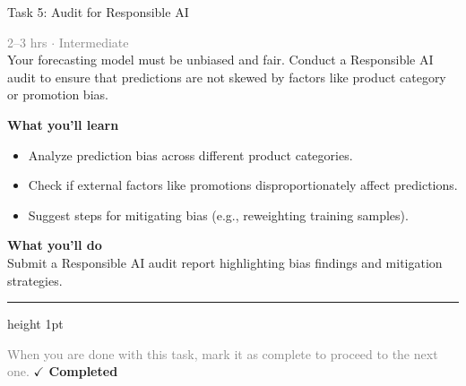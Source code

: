 \documentclass[10pt,a4paper]{article}
\begin{document}
\begin{taskbox}{Task 5: Audit for Responsible AI}

    {\small \textcolor{gray}{2--3 hrs $\cdot$ Intermediate}}\\[12pt]

      
Your forecasting model must be unbiased and fair. Conduct a Responsible AI audit to ensure that predictions are not skewed by factors like product category or promotion bias.  


\vspace{8pt}
{\large \textbf{\textcolor{brandLight}{What you'll learn}}}\\[4pt]  
\begin{itemize}
    \item Analyze prediction bias across different product categories.  
    \item Check if external factors like promotions disproportionately affect predictions.  
    \item Suggest steps for mitigating bias (e.g., reweighting training samples).  
\end{itemize}

\vspace{8pt}
{\large \textbf{\textcolor{brandLight}{What you'll do}}}\\[4pt]  
Submit a Responsible AI audit report highlighting bias findings and mitigation strategies.\par

    \vspace{16pt}

    \textcolor{cardBorder}{\hrule height 1pt}\vspace{8pt}

    \small \textcolor{gray}{When you are done with this task, mark it as complete to proceed to the next one.} \hfill \textbf{\textcolor{brandDark}{$\checkmark$ Completed}}

\end{taskbox}
\end{document}
